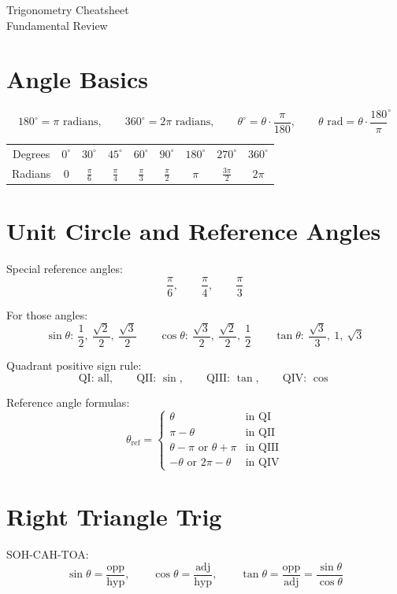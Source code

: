 \documentclass[11pt]{article}
\begin{document}
\begin{center}
{\LARGE Trigonometry Cheatsheet}\\[0.4em]
{\large Fundamental Review}
\end{center}

\section*{Angle Basics}
\[
180^\circ=\pi \text{ radians},\qquad
360^\circ=2\pi \text{ radians},\qquad
\theta^\circ=\theta\cdot \frac{\pi}{180},\qquad
\theta \text{ rad}=\theta\cdot \frac{180}{\pi}^\circ
\]

\begin{center}
\begin{tabular}{ccccccccc}
\toprule
Degrees & $0^\circ$ & $30^\circ$ & $45^\circ$ & $60^\circ$ & $90^\circ$ & $180^\circ$ & $270^\circ$ & $360^\circ$ \\
Radians & $0$ & $\frac{\pi}{6}$ & $\frac{\pi}{4}$ & $\frac{\pi}{3}$ & $\frac{\pi}{2}$ & $\pi$ & $\frac{3\pi}{2}$ & $2\pi$ \\
\bottomrule
\end{tabular}
\end{center}

\section*{Unit Circle and Reference Angles}
Special reference angles:
\[
\frac{\pi}{6},\qquad \frac{\pi}{4},\qquad \frac{\pi}{3}
\]

For those angles:
\[
\sin\theta:\ \frac12,\ \frac{\sqrt2}{2},\ \frac{\sqrt3}{2}
\qquad
\cos\theta:\ \frac{\sqrt3}{2},\ \frac{\sqrt2}{2},\ \frac12
\qquad
\tan\theta:\ \frac{\sqrt3}{3},\ 1,\ \sqrt3
\]

Quadrant positive sign rule:
\[
\text{QI: all},\qquad \text{QII: }\sin,\qquad \text{QIII: }\tan,\qquad \text{QIV: }\cos
\]

Reference angle formulas:
\[
\theta_{\text{ref}}=
\begin{cases}
\theta & \text{in QI}\\
\pi-\theta & \text{in QII}\\
\theta-\pi \text{ or } \theta+\pi & \text{in QIII}\\
-\theta \text{ or } 2\pi-\theta & \text{in QIV}
\end{cases}
\]

\section*{Right Triangle Trig}
SOH-CAH-TOA:
\[
\sin\theta=\frac{\text{opp}}{\text{hyp}},\qquad
\cos\theta=\frac{\text{adj}}{\text{hyp}},\qquad
\tan\theta=\frac{\text{opp}}{\text{adj}}=\frac{\sin\theta}{\cos\theta}
\]
\end{document}
